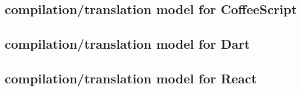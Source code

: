 \subsection{compilation/translation model for CoffeeScript}

\subsection{compilation/translation model for Dart}
\subsection{compilation/translation model for React}

